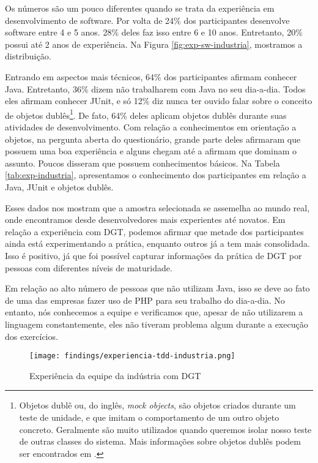 Os números são um pouco diferentes quando se trata da experiência em desenvolvimento
de software. Por volta de 24\% dos participantes desenvolve software entre 4 e 5 anos.
28\% deles faz isso entre 6 e 10 anos. Entretanto, 20\% possui até 2 anos de experiência.
Na Figura \ref{fig:exp-sw-industria}, mostramos a distribuição.

Entrando em aspectos mais técnicos, 64\% dos participantes afirmam conhecer Java. Entretanto,
36\% dizem não trabalharem com Java no seu dia-a-dia. Todos eles afirmam conhecer JUnit,
e só 12\% diz nunca ter ouvido falar sobre o conceito de objetos dublês\footnote{Objetos dublê ou, do inglês, 
\textit{mock objects}, são objetos criados durante um teste de unidade, e que imitam o comportamento de um
outro objeto concreto. Geralmente são muito utilizados quando queremos isolar nosso teste de outras classes
do sistema. Mais informações sobre objetos dublês podem ser encontrados em \cite{mocks}.}. De fato, 64\% deles
aplicam objetos dublês durante suas atividades de desenvolvimento. Com relação a conhecimentos
em orientação a objetos, na pergunta aberta do questionário, grande parte deles 
afirmaram que possuem uma boa experiência e alguns
chegam até a afirmam que dominam o assunto. Poucos disseram que possuem conhecimentos
básicos. Na Tabela \ref{tab:exp-industria},
apresentamos o conhecimento dos participantes em relação a Java, JUnit e objetos dublês.

Esses dados nos mostram que a amostra selecionada se assemelha ao mundo real, onde
encontramos desde desenvolvedores mais experientes até novatos. Em relação a experiência com DGT,
podemos afirmar que metade dos participantes ainda está experimentando a prática, enquanto
outros já a tem mais consolidada. Isso é positivo, já que foi possível capturar informações
da prática de DGT por pessoas com diferentes níveis de maturidade.

Em relação ao alto número de pessoas que não utilizam Java, isso se deve ao fato de uma das
empresas fazer uso de PHP para seu trabalho do dia-a-dia. No entanto, nós conhecemos a equipe
e verificamos que, apesar de não utilizarem a linguagem constantemente, eles não tiveram
problema algum durante a execução dos exercícios.

\begin{figure}[h!]
  \centering
  \texttt{[image: findings/experiencia-tdd-industria.png]}
  \caption{Experiência da equipe da indústria com DGT}
  \label{fig:exp-tdd-industria}
\end{figure}

